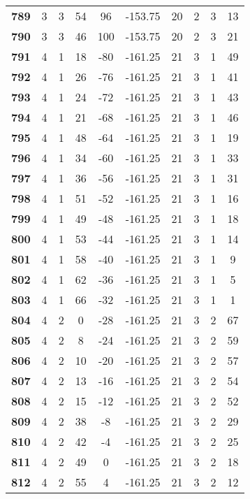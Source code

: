 \documentclass{article}%
\begin{document}
\begin{longtable}{cccccccccc}
        \textbf{789} & 3 & 3 & 54 & 96 & -153.75 & 20 & 2 & 3 & 13 \\ 
        \textbf{790} & 3 & 3 & 46 & 100 & -153.75 & 20 & 2 & 3 & 21 \\ 
        \textbf{791} & 4 & 1 & 18 & -80 & -161.25 & 21 & 3 & 1 & 49 \\ 
        \textbf{792} & 4 & 1 & 26 & -76 & -161.25 & 21 & 3 & 1 & 41 \\ 
        \textbf{793} & 4 & 1 & 24 & -72 & -161.25 & 21 & 3 & 1 & 43 \\ 
        \textbf{794} & 4 & 1 & 21 & -68 & -161.25 & 21 & 3 & 1 & 46 \\ 
        \textbf{795} & 4 & 1 & 48 & -64 & -161.25 & 21 & 3 & 1 & 19 \\ 
        \textbf{796} & 4 & 1 & 34 & -60 & -161.25 & 21 & 3 & 1 & 33 \\ 
        \textbf{797} & 4 & 1 & 36 & -56 & -161.25 & 21 & 3 & 1 & 31 \\ 
        \textbf{798} & 4 & 1 & 51 & -52 & -161.25 & 21 & 3 & 1 & 16 \\ 
        \textbf{799} & 4 & 1 & 49 & -48 & -161.25 & 21 & 3 & 1 & 18 \\ 
        \textbf{800} & 4 & 1 & 53 & -44 & -161.25 & 21 & 3 & 1 & 14 \\ 
        \textbf{801} & 4 & 1 & 58 & -40 & -161.25 & 21 & 3 & 1 & 9 \\ 
        \textbf{802} & 4 & 1 & 62 & -36 & -161.25 & 21 & 3 & 1 & 5 \\ 
        \textbf{803} & 4 & 1 & 66 & -32 & -161.25 & 21 & 3 & 1 & 1 \\ 
        \textbf{804} & 4 & 2 & 0 & -28 & -161.25 & 21 & 3 & 2 & 67 \\ 
        \textbf{805} & 4 & 2 & 8 & -24 & -161.25 & 21 & 3 & 2 & 59 \\ 
        \textbf{806} & 4 & 2 & 10 & -20 & -161.25 & 21 & 3 & 2 & 57 \\ 
        \textbf{807} & 4 & 2 & 13 & -16 & -161.25 & 21 & 3 & 2 & 54 \\ 
        \textbf{808} & 4 & 2 & 15 & -12 & -161.25 & 21 & 3 & 2 & 52 \\ 
        \textbf{809} & 4 & 2 & 38 & -8 & -161.25 & 21 & 3 & 2 & 29 \\ 
        \textbf{810} & 4 & 2 & 42 & -4 & -161.25 & 21 & 3 & 2 & 25 \\ 
        \textbf{811} & 4 & 2 & 49 & 0 & -161.25 & 21 & 3 & 2 & 18 \\ 
        \textbf{812} & 4 & 2 & 55 & 4 & -161.25 & 21 & 3 & 2 & 12 \\ 

\end{longtable}
\end{document}
